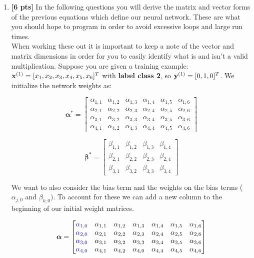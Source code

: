 \begin{enumerate}
\item \textbf{[6 pts]} In the following questions you will derive the matrix and vector forms of the previous equations which define our neural network. These are what you should hope to program in order to avoid excessive loops and large run times.\\
When working these out it is important to keep a note of the vector and matrix dimensions in order for you to easily identify what is and isn't a valid multiplication. Suppose you are given a training example: $\mathbf{x}^{(1)}=[x_1,x_2,x_3,x_4,x_5,x_6]^T$ with \textbf{label class 2}, so $\mathbf{y}^{(1)}=[0,1,0]^T$. We initialize the network weights as:
\begin{center}
$$\boldsymbol{\alpha^*}=
    \begin{bmatrix}
    \alpha_{1,1} & \alpha_{1,2} & \alpha_{1,3} & \alpha_{1,4} & \alpha_{1,5} & \alpha_{1,6} \\
    \alpha_{2,1} & \alpha_{2,2} & \alpha_{2,3} & \alpha_{2,4} & \alpha_{2,5} & \alpha_{2,6} \\
    \alpha_{3,1} & \alpha_{3,2} & \alpha_{3,3} & \alpha_{3,4} & \alpha_{3,5} & \alpha_{3,6} \\
    \alpha_{4,1} & \alpha_{4,2} & \alpha_{4,3} & \alpha_{4,4} & \alpha_{4,5} & \alpha_{4,6}
    \end{bmatrix}$$
    
$$\boldsymbol{\beta^*}=
    \begin{bmatrix}
    \beta_{1,1} & \beta_{1,2} & \beta_{1,3} & \beta_{1,4} \\
    \beta_{2,1} & \beta_{2,2} & \beta_{2,3} & \beta_{2,4} \\
    \beta_{3,1} & \beta_{3,2} & \beta_{3,3} & \beta_{3,4}
    \end{bmatrix}
$$
\end{center}
    
We want to also consider the bias term and the weights on the bias terms (${\alpha}_{j,0}$ and ${\beta}_{k,0})$. To account for these we can add a new column to the beginning of our initial weight matrices. 

$$\boldsymbol{\alpha}=
    \begin{bmatrix}
    \textcolor{blue}{\alpha_{1,0}} & \alpha_{1,1} & \alpha_{1,2} & \alpha_{1,3} & \alpha_{1,4} & \alpha_{1,5} & \alpha_{1,6} \\
    \textcolor{blue}{\alpha_{2,0}} & \alpha_{2,1} & \alpha_{2,2} & \alpha_{2,3} & \alpha_{2,4} & \alpha_{2,5} & \alpha_{2,6} \\
    \textcolor{blue}{\alpha_{3,0}} & \alpha_{3,1} & \alpha_{3,2} & \alpha_{3,3} & \alpha_{3,4} & \alpha_{3,5} & \alpha_{3,6} \\
    \textcolor{blue}{\alpha_{4,0}} & \alpha_{4,1} & \alpha_{4,2} & \alpha_{4,0} & \alpha_{4,4} & \alpha_{4,5} & \alpha_{4,6}
    \end{bmatrix}$$
    

\end{enumerate}
